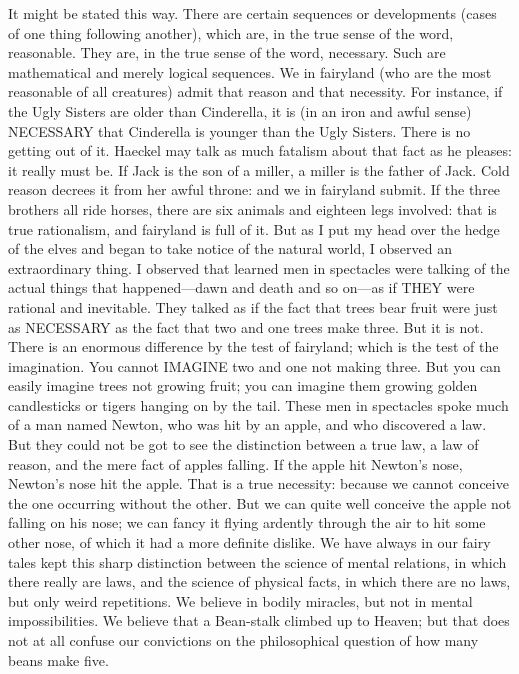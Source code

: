 It might be stated this way. There are certain sequences or developments (cases of one thing following another), which are, in the true sense of the word, reasonable. They are, in the true sense of the word, necessary. Such are mathematical and merely logical sequences. We in fairyland (who are the most reasonable of all creatures) admit that reason and that necessity. For instance, if the Ugly Sisters are older than Cinderella, it is (in an iron and awful sense) NECESSARY that Cinderella is younger than the Ugly Sisters. There is no getting out of it. Haeckel may talk as much fatalism about that fact as he pleases: it really must be. If Jack is the son of a miller, a miller is the father of Jack. Cold reason decrees it from her awful throne: and we in fairyland submit. If the three brothers all ride horses, there are six animals and eighteen legs involved: that is true rationalism, and fairyland is full of it. But as I put my head over the hedge of the elves and began to take notice of the natural world, I observed an extraordinary thing. I observed that learned men in spectacles were talking of the actual things that happened—dawn and death and so on—as if THEY were rational and inevitable. They talked as if the fact that trees bear fruit were just as NECESSARY as the fact that two and one trees make three. But it is not. There is an enormous difference by the test of fairyland; which is the test of the imagination. You cannot IMAGINE two and one not making three. But you can easily imagine trees not growing fruit; you can imagine them growing golden candlesticks or tigers hanging on by the tail. These men in spectacles spoke much of a man named Newton, who was hit by an apple, and who discovered a law. But they could not be got to see the distinction between a true law, a law of reason, and the mere fact of apples falling. If the apple hit Newton’s nose, Newton’s nose hit the apple. That is a true necessity: because we cannot conceive the one occurring without the other. But we can quite well conceive the apple not falling on his nose; we can fancy it flying ardently through the air to hit some other nose, of which it had a more definite dislike. We have always in our fairy tales kept this sharp distinction between the science of mental relations, in which there really are laws, and the science of physical facts, in which there are no laws, but only weird repetitions. We believe in bodily miracles, but not in mental impossibilities. We believe that a Bean-stalk climbed up to Heaven; but that does not at all confuse our convictions on the philosophical question of how many beans make five.

